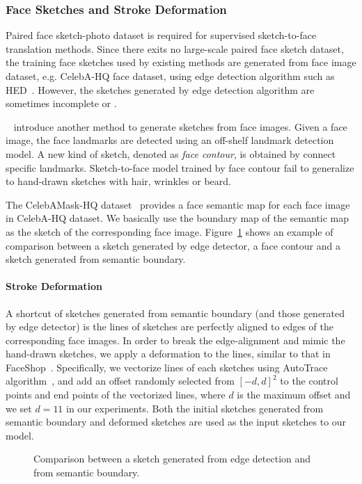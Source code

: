 
\subsubsection{Face Sketches and Stroke Deformation}
\label{subsec:algorithm_data}
Paired face sketch-photo dataset is required for supervised sketch-to-face translation methods.
Since there exits no large-scale paired face sketch dataset, the training face sketches used by existing methods are generated from face image dataset, e.g. CelebA-HQ face dataset, using edge detection algorithm such as HED~\cite{HED}.
%
However, the sketches generated by edge detection algorithm are sometimes incomplete or . 

~\cite{pix2pixHD} introduce another method to generate sketches from face images. Given a face image, the face landmarks are detected using an off-shelf landmark detection model. A new kind of sketch, denoted as \textit{face contour}, is obtained by connect specific landmarks. Sketch-to-face model trained by face contour fail to generalize to hand-drawn sketches with hair, wrinkles or beard. 

The CelebAMask-HQ dataset~\cite{CelebAMask-HQ} provides a face semantic map for each face image in CelebA-HQ dataset. We basically use the boundary map of the semantic map as the sketch of the corresponding face image. Figure~\ref{fig:sketch_data} shows an example of comparison between a sketch generated by edge detector, a face contour and a sketch generated from semantic boundary.
%


\paragraph{Stroke Deformation}
A shortcut of sketches generated from semantic boundary (and those generated by edge detector) is the lines of sketches are perfectly aligned to edges of the corresponding face images. In order to break the edge-alignment and mimic the hand-drawn sketches, we apply a deformation to the lines, similar to that in FaceShop~\cite{FaceShop}. Specifically, we vectorize lines of each sketches using AutoTrace algorithm~\cite{AutoTrace}, and add an offset randomly selected from $[-d, d]^2$ to the control points and end points of the vectorized lines, where $d$ is the maximum offset and we set $d=11$ in our experiments.
%
Both the initial sketches generated from semantic boundary and deformed sketches are used as the input sketches to our model.


\begin{figure}
	\centering
	\vspace{1.0cm}
	\caption{Comparison between a sketch generated from edge detection and from semantic boundary.}
	\label{fig:sketch_data}
\end{figure}